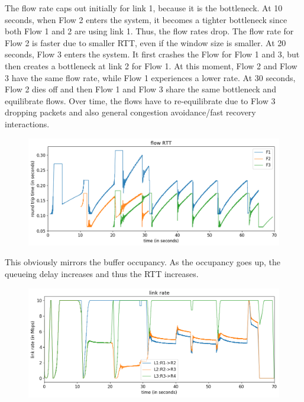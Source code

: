 \documentclass{article}
\begin{document}
The flow rate caps out initially for link 1, because it is the bottleneck. At 10 seconds, when Flow 2 enters the system, it becomes a tighter bottleneck since both Flow 1 and 2 are using link 1. Thus, the flow rates drop. The flow rate for Flow 2 is faster due to smaller RTT, even if the window size is smaller. At 20 seconds, Flow 3 enters the system. It first crashes the Flow for Flow 1 and 3, but then creates a bottleneck at link 2 for Flow 1. At this moment, Flow 2 and Flow 3 have the same flow rate, while Flow 1 experiences a lower rate. At 30 seconds, Flow 2 dies off and then Flow 1 and Flow 3 share the same bottleneck and equilibrate flows.  Over time, the flows have to re-equilibrate due to Flow 3 dropping packets and also general congestion avoidance/fast recovery interactions.

\begin{figure}[H]
\centering
\includegraphics[width = \textwidth]{test_case2_reno flow RTT.png}
\end{figure}

This obviously mirrors the buffer occupancy. As the occupancy goes up, the queueing delay increases and thus the RTT increases.

\begin{figure}[H]
\centering
\includegraphics[width = \textwidth]{test_case2_reno link rate.png}
\end{figure}
\end{document}
